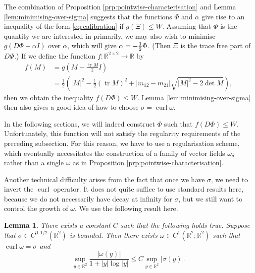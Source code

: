 \documentclass[a4paper]{article}
\newcommand{\R}{\mathbb{R}}
\let\div\relax\DeclareMathOperator{\div}{div}
\DeclareMathOperator{\curl}{curl}
\DeclareMathOperator{\tr}{tr}
\newtheorem{lemma}[theorem]{Lemma}
\theoremstyle{definition}
\theoremstyle{remark}
\begin{document}
The combination of Proposition \ref{prp:pointwise-characterisation} and
Lemma \ref{lem:minimising-over-sigma} suggests that the functions $\Phi$
and $\alpha$ give rise to an inequality of the form \eqref{eq:calibration}
if $g(\Xi) \le W$. Assuming that $\Phi$ is the quantity we are interested
in primarily, we may also wish to minimise $g(D\Phi + \alpha I)$ over
$\alpha$, which will give $\alpha = -\frac{1}{2} \div \Phi$.
(Then $\Xi$ is the trace free part of $D\Phi$.)
If we define the function $f \colon \R^{2 \times 2} \to \R$ by
\[
\begin{split}
f(M) & = g\left(M - \frac{\tr M}{2} I\right) \\
& = \frac{1}{2} \left(|M|^2 - \frac{1}{2} (\tr M)^2 + |m_{12} - m_{21}| \sqrt{|M|^2 - 2\det M}\right),
\end{split}
\]
then we obtain the inequality $f(D\Phi) \le W$.
Lemma \ref{lem:minimising-over-sigma}
then also gives a good idea of how to choose $\sigma = \curl \omega$.

In the following sections, we will indeed construct $\Phi$ such that $f(D\Phi) \le W$.
Unfortunately, this function will not satisfy the
regularity requirements of the preceding subsection. For this reason, we have to use
a regularisation scheme, which eventually necessitates the construction of a family of
vector fields $\omega_\delta$ rather than a single $\omega$ as in Proposition \ref{prp:pointwise-characterisation}.

Another technical difficulty arises from the fact that once we have $\sigma$, we need to
invert the $\curl$ operator. It does not quite suffice to use standard results here,
because we do not necessarily have decay at infinity for $\sigma$, but we still want to
control the growth of $\omega$. We use the following result here.

\begin{lemma} \label{lem:inverting-curl}
There exists a constant $C$ such that the following holds true.
Suppose that $\sigma \in C^{0, 1/2}(\R^2)$ is bounded. Then there exists
$\omega \in C^1(\R^2; \R^2)$ such that $\curl \omega = \sigma$ and
\[
\sup_{y \in \R^2} \frac{|\omega(y)|}{1 + |y| \log |y|} \le C\sup_{y \in \R^2} |\sigma(y)|.
\]
\end{lemma}
\end{document}
